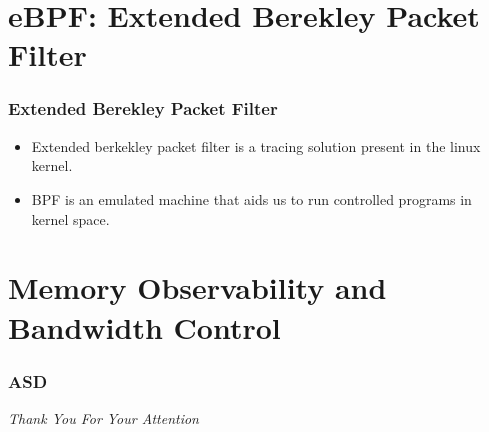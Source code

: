 \documentclass{beamer}
\begin{document}
\section{eBPF: Extended Berekley Packet Filter}
\begin{frame}
    \frametitle{Extended Berekley Packet Filter}
    \begin{itemize}
        \item Extended berkekley packet filter is a tracing solution present
            in the linux kernel.
        \item BPF is an emulated machine that aids us to run controlled
            programs in kernel space.
    \end{itemize}
\end{frame}
\section{Memory Observability and Bandwidth Control}
\begin{frame}
    \frametitle{ASD}
\end{frame}

\begin{frame}
  \centering \Large
  \emph{Thank You For Your Attention}
\end{frame}
\end{document}
